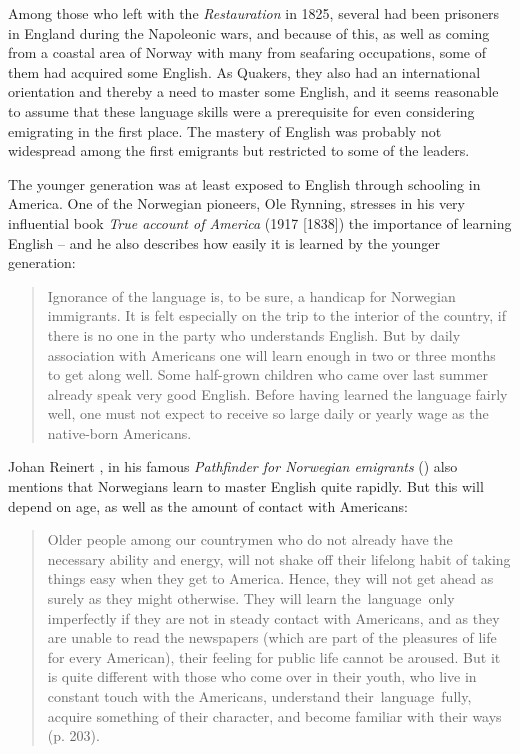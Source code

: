 \documentclass[output=paper]{langscibook}
\begin{document}
Among those who left with the \textit{Restauration} in 1825, several had been prisoners in England during the Napoleonic wars, and because of this, as well as coming from a coastal area of Norway with many from seafaring occupations, some of them had acquired some English. As Quakers, they also had an international orientation and thereby a need to master some English, and it seems reasonable to assume that these language skills were a prerequisite for even considering emigrating in the first place. The mastery of English was probably not widespread among the first emigrants but restricted to some of the leaders.

The younger generation was at least exposed to English through schooling in America. One of the Norwegian pioneers, Ole Rynning, stresses in his very influential book \textit{True account of America} (1917 [1838]) the importance of learning English – and he also describes how easily it is learned by the younger generation: 

\begin{quote}
Ignorance of the language is, to be sure, a handicap for Norwegian immigrants. It is felt especially on the trip to the interior of the country, if there is no one in the party who understands English. But by daily association with Americans one will learn enough in two or three months to get along well. Some half-grown children who came over last summer already speak very good English. Before having learned the language fairly well, one must not expect to receive so large daily or yearly wage as the native-born Americans. \citep[259]{Rynning1917} 
\end{quote}

Johan Reinert \citeauthor{Reiersen1981}, in his famous \textit{Pathfinder for Norwegian emigrants} (\citeyear[71]{Reiersen1981}) also mentions that Norwegians learn to master English quite rapidly. But this will depend on age, as well as the amount of contact with Americans: 

\begin{quote}
Older people among our countrymen who do not already have the necessary ability and energy, will not shake off their lifelong habit of taking things easy when they get to America. Hence, they will not get ahead as surely as they might otherwise. They will learn the~language~only imperfectly if they are not in steady contact with Americans, and as they are unable to read the newspapers (which are part of the pleasures of life for every American), their feeling for public life cannot be aroused. But it is quite different with those who come over in their youth, who live in constant touch with the Americans, understand their~language~fully, acquire something of their character, and become familiar with their ways (p. 203). 
\end{quote}
\end{document}
